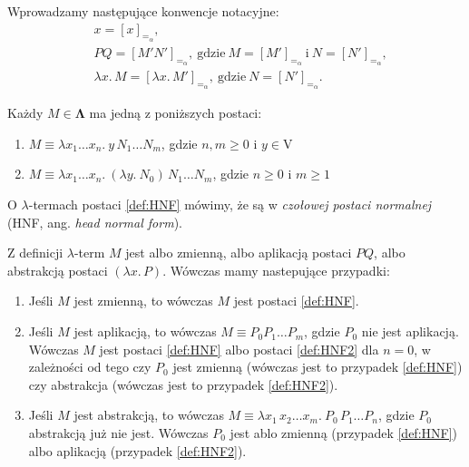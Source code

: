 \begin{konwencja*}
Wprowadzamy następujące konwencje notacyjne:
\begin{align*}
  &x = [x]_{=_\alpha},\\
  &PQ = [M'N']_{=_\alpha},\ \text{gdzie}\ M=[M']_{=_\alpha}\ \text{i}\ N=[N']_{=_\alpha},\\
  &\lambda x.\,M =  [\lambda x.\,M']_{=_\alpha},\  \text{gdzie}\ N=[N']_{=_\alpha}.
\end{align*}
\end{konwencja*}


\begin{twierdzenie}
 Każdy \(M\in\mathbf{\Lambda}\) ma jedną z poniższych postaci:
 \begin{enumerate}[label={(\arabic*)}, ref={(\arabic*)}]
    \setlength\itemsep{0em}
    \item \(M \equiv \lambda x_1\dots x_n.\ y\,N_1 \dots N_m\), gdzie \(n,m\geq 0\) i \(y\in \mathrm{V}\)\label{def:HNF}
    \item \(M \equiv \lambda x_1\dots x_n.\ (\lambda y.\ N_0)\,N_1\dots N_m\), gdzie \(n\geq 0\) i \(m\geq 1\)\label{def:HNF2}
  \end{enumerate}
  O \(\lambda\)-termach postaci \ref{def:HNF} mówimy, że są w \emph{czołowej postaci normalnej} (HNF, ang. \emph{head normal form}). 
\end{twierdzenie}
\begin{dowod}
  Z definicji \(\lambda\)-term \(M\) jest albo zmienną, albo aplikacją postaci \(PQ\), albo abstrakcją postaci \((\lambda x.\,P)\). Wówczas mamy nastepujące przypadki:
  \begin{enumerate}[label={\roman*)}, ref={\roman*)}]
    \setlength\itemsep{0em}
    \item Jeśli \(M\) jest zmienną, to wówczas \(M\) jest postaci \ref{def:HNF}.
    \item Jeśli \(M\) jest aplikacją, to wówczas \(M \equiv P_{0} P_{1} \dots P_{m} \), gdzie \(P_{0}\) nie jest aplikacją. Wówczas \(M\) jest postaci \ref{def:HNF} albo postaci \ref{def:HNF2} dla \(n=0\), w zależności od tego czy \(P_0\) jest zmienną (wówczas jest to przypadek \ref{def:HNF}) czy abstrakcja (wówczas jest to przypadek \ref{def:HNF2}).
    \item Jeśli \(M\) jest abstrakcją, to wówczas \(M\equiv \lambda x_1\,x_2\dots x_m.\ P_0\,P_1\dots P_n\), gdzie \(P_0\) abstrakcją już nie jest. Wówczas \(P_0\) jest ablo zmienną (przypadek \ref{def:HNF}) albo aplikacją (przypadek \ref{def:HNF2}).\qedhere
  \end{enumerate}
\end{dowod}

